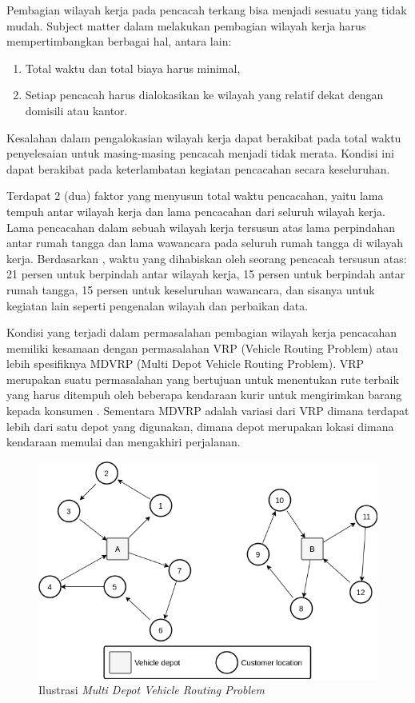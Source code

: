 Pembagian wilayah kerja pada pencacah terkang bisa menjadi sesuatu yang tidak mudah. Subject matter dalam melakukan pembagian wilayah kerja harus mempertimbangkan berbagai hal, antara lain:
\begin{enumerate}
	\item Total waktu dan total biaya harus minimal, 
	\item Setiap pencacah harus dialokasikan ke wilayah yang relatif dekat dengan domisili atau kantor.
\end{enumerate}
Kesalahan dalam pengalokasian wilayah kerja dapat berakibat pada total waktu penyelesaian untuk masing-masing pencacah menjadi tidak merata. Kondisi ini dapat berakibat pada keterlambatan kegiatan pencacahan secara keseluruhan.


Terdapat 2 (dua) faktor yang menyusun total waktu pencacahan, yaitu lama tempuh antar wilayah kerja dan lama pencacahan dari seluruh wilayah kerja. Lama pencacahan dalam sebuah wilayah kerja tersusun atas lama perpindahan antar rumah tangga dan lama wawancara pada seluruh rumah tangga di wilayah kerja. Berdasarkan \citep{sudman_time_1965}, waktu yang dihabiskan oleh seorang pencacah tersusun atas: 21 persen untuk berpindah antar wilayah kerja, 15 persen untuk berpindah antar rumah tangga, 15 persen untuk keseluruhan wawancara, dan sisanya untuk kegiatan lain seperti pengenalan wilayah dan perbaikan data.


Kondisi yang terjadi dalam permasalahan pembagian wilayah kerja pencacahan memiliki kesamaan dengan permasalahan VRP (Vehicle Routing Problem) atau lebih spesifiknya MDVRP (Multi Depot Vehicle Routing Problem). VRP merupakan suatu permasalahan yang bertujuan untuk menentukan rute terbaik yang harus ditempuh oleh beberapa kendaraan kurir untuk mengirimkan barang kepada konsumen \citep{dantzig_truck_1959}. Sementara MDVRP adalah variasi dari VRP dimana terdapat lebih dari satu depot yang digunakan, dimana depot merupakan lokasi dimana kendaraan memulai dan mengakhiri perjalanan.


\begin{figure}[!]
    \centering
    \includegraphics[width=12cm]{Resources/Images/mdvrp-illustration}
    \caption{Ilustrasi \textit{Multi Depot Vehicle Routing Problem}}
    \label{fig:mtsp-ilustration}
\end{figure}


